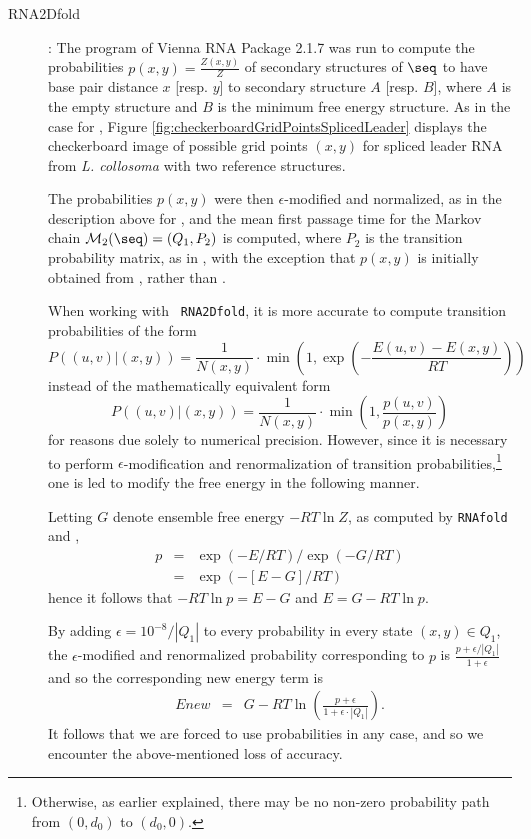\begin{description}
\item[RNA2Dfold]: The program \rnatwofold of Vienna RNA Package
2.1.7 was run to compute the probabilities $p(x,y) = \frac{Z(x,y)}{Z}$
of secondary structures of $\seq$ to have base pair distance $x$
[resp. $y$] to secondary structure $A$ [resp. $B$], where $A$ is the
empty structure and $B$ is the minimum free energy structure. As in
the case for \ffttwo,
Figure \ref{fig:checkerboardGridPointsSplicedLeader} displays the
checkerboard image of possible grid points $(x,y)$ for spliced leader
RNA from {\em L. collosoma} with two reference structures.

The probabilities $p(x,y)$ were then $\epsilon$-modified and
normalized, as in the description above for \ffteq, and the mean
first passage time for the Markov chain $\mathcal{M}_2(\seq) =
(Q_1,P_2)$ is computed, where $P_2$ is the transition probability
matrix, as in \ffttwo, with the exception that $p(x,y)$ is
initially obtained from \rnatwofold, rather than \ffttwo.

When working with {\tt
RNA2Dfold}, it is more accurate to compute transition probabilities of
the form $$ P( (u,v) | (x,y) ) = \frac{1}{N(x,y)} \cdot \min(1,
\exp(-\frac{E(u,v)-E(x,y)}{RT})) $$ instead of the mathematically
equivalent form $$ P( (u,v) | (x,y) ) = \frac{1}{N(x,y)} \cdot \min(1,
\frac{p(u,v)}{p(x,y)}) $$ for reasons due solely to numerical
precision. However, since it is necessary to perform
$\epsilon$-modification and renormalization of transition
probabilities,\footnote{Otherwise, as earlier explained, there may be
no non-zero probability path from $(0,d_0)$ to $(d_0,0)$.} one is led
to modify the free energy in the following manner.

Letting $G$ denote ensemble free energy $-RT \ln Z$, as computed by
{\tt RNAfold} and \rnatwofold,
\begin{eqnarray*}
p &=& \exp(-E/RT)/\exp(-G/RT) \\
&=& \exp(-[ E-G] /RT)
\end{eqnarray*}
hence it follows that $-RT \ln p = E-G$ and $E = G-RT \ln p$.

By adding $\epsilon=10^{-8}/|Q_1|$ to every probability in every state
$(x,y) \in Q_1$, the $\epsilon$-modified and renormalized probability
corresponding to $p$ is $\frac{p+\epsilon/|Q_1|}{1+ \epsilon}$ and so
the corresponding new energy term is
\begin{eqnarray}
\label{eq:modifiedEnergyTerm} Enew &=& G- RT \ln( \frac{p+\epsilon}{1
+ \epsilon \cdot |Q_1|} ).
\end{eqnarray}
It follows that we are forced to use probabilities in any case, and so
we encounter the above-mentioned loss of accuracy.


\end{description}
